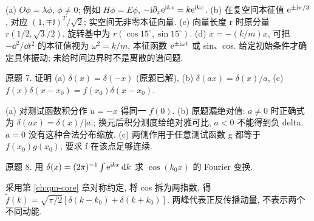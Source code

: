 \begin{solution}
(a) $O\phi=\lambda\phi$, $\phi\ne0$; 例如 $H\phi=E\phi$, $-\mathrm i\partial_x\mathrm e^{\mathrm i kx}=k\mathrm e^{\mathrm i kx}$. (b) 在复空间本征值 $\mathrm e^{\pm\mathrm i\pi/3}$, 对应 $(1,\mp\ii)^T/\sqrt2$; 实空间无非零本征向量. (c) 向量长度 r 时原分量 $r(1/2,\sqrt3/2)$, 旋转基中为 $r(\cos15^\circ,\sin15^\circ)$. (d) $\ddot x=-(k/m)x$, 可把 $-\dd^2/\dd t^2$ 的本征值视为 $\omega^2=k/m$, 本征函数 $\mathrm e^{\pm\mathrm i\omega t}$ 或 sin、cos. 给定初始条件才确定具体振动; 未给时间边界时不是离散的谱问题.
\end{solution}
\begin{exercise}\label{ex:2202-1-7}
原题 7. 证明 (a) $\delta(x)=\delta(-x)$ (原题已解), (b) $\delta(ax)=\delta(x)/a$, (c) $f(x)\delta(x-x_0)=f(x_0)\delta(x-x_0)$.
\end{exercise}
\begin{solution}
(a) 对测试函数积分作 $u=-x$ 得同一 $f(0)$. (b) 原题漏绝对值: $a\ne0$ 时正确式为 $\delta(ax)=\delta(x)/|a|$; 换元后积分测度给绝对雅可比, $a<0$ 不能得到负 delta. $a=0$ 没有这种合法分布缩放. (c) 两侧作用于任意测试函数 g 都等于 $f(x_0)g(x_0)$, 要求 f 在该点足够连续.
\end{solution}
\begin{exercise}\label{ex:2202-1-8}
原题 8. 用 $\delta(x)=(2\pi)^{-1}\int\mathrm e^{\mathrm i kx}\,\mathrm d k$ 求 $\cos(k_0x)$ 的 Fourier 变换.
\end{exercise}
\begin{solution}
采用第 \ref{ch:qm-core} 章对称约定, 将 cos 拆为两指数, 得 $\widetilde f(k)=\sqrt{\pi/2}[\delta(k-k_0)+\delta(k+k_0)]$. 两峰代表正反传播动量, 不表示两个不同动能.
\end{solution}
